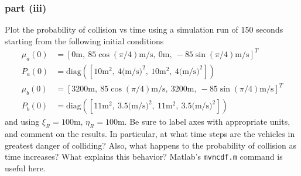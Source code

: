 \documentclass[11pt]{article}
\begin{document}
\subsubsection*{part (iii)}
Plot the probability of collision vs time using a simulation run of 150 seconds starting from the following initial conditions
\begin{align*}
	\mu_a(0) &= [0\text{m},\ 85\cos(\pi/4)\text{m/s},\ 0\text{m},\ -85\sin(\pi/4)\text{m/s}]^T \\
	P_a(0) &= \text{diag}([10\text{m}^2,\ 4\text{(m/s)}^2,\ 10\text{m}^2,\ 4\text{(m/s)}^2]) \\
	\mu_b(0) &= [3200\text{m},\ 85\cos(\pi/4)\text{m/s},\ 3200\text{m},\ -85\sin(\pi/4)\text{m/s}]^T \\
	P_b(0) &= \text{diag}([11\text{m}^2,\ 3.5\text{(m/s)}^2,\ 11\text{m}^2,\ 3.5\text{(m/s)}^2])
\end{align*}
and using $\xi_R=100$m, $\eta_R=100$m. Be sure to label axes with appropriate units, and comment on the results. In particular, at what time steps are the vehicles in greatest danger of colliding? Also, what happens to the probability of collision as time increases? What explains this behavior? Matlab's \texttt{mvncdf.m} command is useful here.
\end{document}
